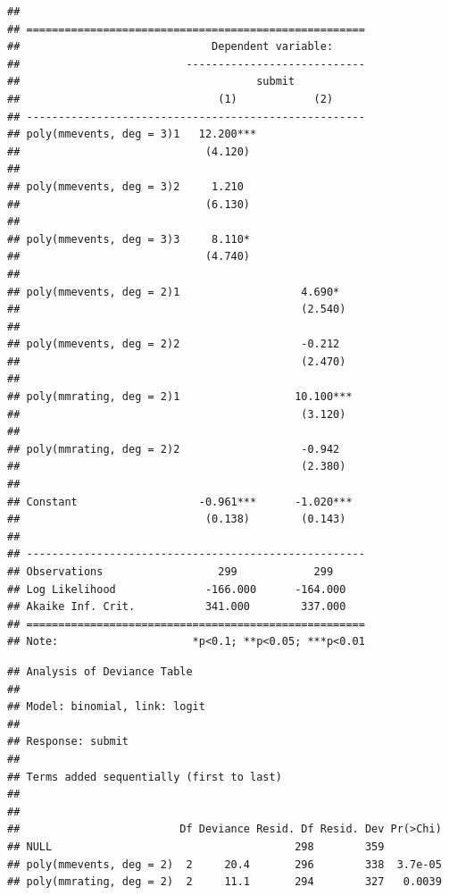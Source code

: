 \documentclass[12pt,]{article}
\theoremstyle{plain} %
\begin{document}
\begin{verbatim}
## 
## =====================================================
##                              Dependent variable:     
##                          ----------------------------
##                                     submit           
##                               (1)            (2)     
## -----------------------------------------------------
## poly(mmevents, deg = 3)1   12.200***                 
##                             (4.120)                  
##                                                      
## poly(mmevents, deg = 3)2     1.210                   
##                             (6.130)                  
##                                                      
## poly(mmevents, deg = 3)3     8.110*                  
##                             (4.740)                  
##                                                      
## poly(mmevents, deg = 2)1                   4.690*    
##                                            (2.540)   
##                                                      
## poly(mmevents, deg = 2)2                   -0.212    
##                                            (2.470)   
##                                                      
## poly(mmrating, deg = 2)1                  10.100***  
##                                            (3.120)   
##                                                      
## poly(mmrating, deg = 2)2                   -0.942    
##                                            (2.380)   
##                                                      
## Constant                   -0.961***      -1.020***  
##                             (0.138)        (0.143)   
##                                                      
## -----------------------------------------------------
## Observations                  299            299     
## Log Likelihood              -166.000      -164.000   
## Akaike Inf. Crit.           341.000        337.000   
## =====================================================
## Note:                     *p<0.1; **p<0.05; ***p<0.01
\end{verbatim}

\begin{verbatim}
## Analysis of Deviance Table
## 
## Model: binomial, link: logit
## 
## Response: submit
## 
## Terms added sequentially (first to last)
## 
## 
##                         Df Deviance Resid. Df Resid. Dev Pr(>Chi)
## NULL                                      298        359         
## poly(mmevents, deg = 2)  2     20.4       296        338  3.7e-05
## poly(mmrating, deg = 2)  2     11.1       294        327   0.0039
\end{verbatim}
\end{document}
